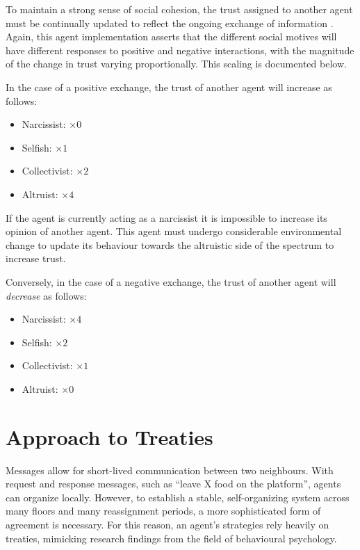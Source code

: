 To maintain a strong sense of social cohesion, the trust assigned to another agent must be continually updated to reflect the ongoing exchange of information \cite{trustEEE}. Again, this agent implementation asserts that the different social motives will have different responses to positive and negative interactions, with the magnitude of the change in trust varying proportionally. This scaling is documented below.

In the case of a positive exchange, the trust of another agent will increase as follows:
\begin{itemize}
    \item Narcissist: $\times 0$
    \item Selfish: $\times 1$
    \item Collectivist: $\times 2$
    \item Altruist: $\times 4$
\end{itemize}

If the agent is currently acting as a narcissist it is impossible to increase its opinion of another agent. This agent must undergo considerable environmental change to update its behaviour towards the altruistic side of the spectrum to increase trust.

Conversely, in the case of a negative exchange, the trust of another agent will \textit{decrease} as follows:
\begin{itemize}
    \item Narcissist: $\times 4$
    \item Selfish: $\times 2$
    \item Collectivist: $\times 1$
    \item Altruist: $\times 0$
\end{itemize}


\section{Approach to Treaties}\label{self-organization}

Messages allow for short-lived communication between two neighbours. With request and response messages, such as “leave X food on the platform”, agents can organize locally. However, to establish a stable, self-organizing system across many floors and many reassignment periods, a more sophisticated form of agreement is necessary. For this reason, an agent's strategies rely heavily on treaties, mimicking research findings from the field of behavioural psychology.

